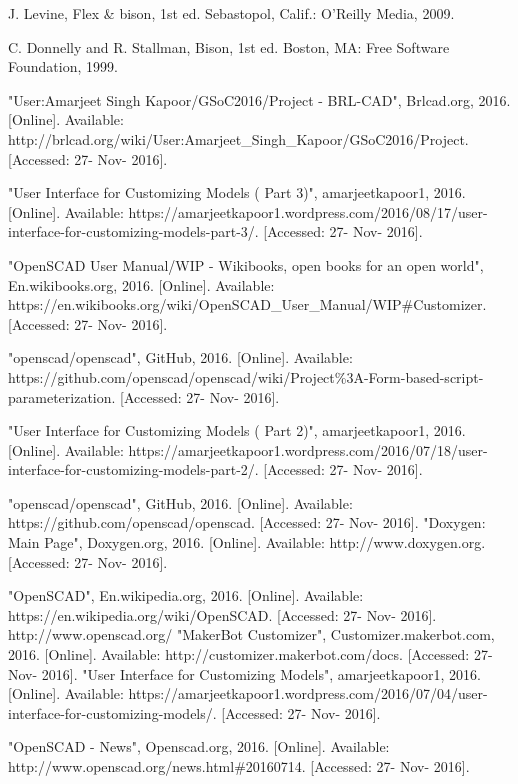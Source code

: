  
\begin{thebibliography}{22}

\bibitem{} J. Levine, Flex \& bison, 1st ed. Sebastopol, Calif.: O'Reilly Media, 2009.

\bibitem{} C. Donnelly and R. Stallman, Bison, 1st ed. Boston, MA: Free Software Foundation, 1999.

\bibitem{} "User:Amarjeet Singh Kapoor/GSoC2016/Project - BRL-CAD", Brlcad.org, 2016. [Online]. Available: http://brlcad.org/wiki/User:Amarjeet\_Singh\_Kapoor/GSoC2016/Project. [Accessed: 27- Nov- 2016].

\bibitem{} "User Interface for Customizing Models ( Part 3)", amarjeetkapoor1, 2016. [Online]. Available: https://amarjeetkapoor1.wordpress.com/2016/08/17/user-interface-for-customizing-models-part-3/. [Accessed: 27- Nov- 2016].


\bibitem{} "OpenSCAD User Manual/WIP - Wikibooks, open books for an open world", En.wikibooks.org, 2016. [Online]. Available: https://en.wikibooks.org/wiki/OpenSCAD\_User\_Manual/WIP\#Customizer. [Accessed: 27- Nov- 2016].

\bibitem{} "openscad/openscad", GitHub, 2016. [Online]. Available: https://github.com/openscad/openscad/wiki/Project\%3A-Form-based-script-parameterization. [Accessed: 27- Nov- 2016].

\bibitem{} "User Interface for Customizing Models ( Part 2)", amarjeetkapoor1, 2016. [Online]. Available: https://amarjeetkapoor1.wordpress.com/2016/07/18/user-interface-for-customizing-models-part-2/. [Accessed: 27- Nov- 2016].

\bibitem{} "openscad/openscad", GitHub, 2016. [Online]. Available: https://github.com/openscad/openscad. [Accessed: 27- Nov- 2016].
\bibitem{} "Doxygen: Main Page", Doxygen.org, 2016. [Online]. Available: http://www.doxygen.org. [Accessed: 27- Nov- 2016].

\bibitem{} "OpenSCAD", En.wikipedia.org, 2016. [Online]. Available: https://en.wikipedia.org/wiki/OpenSCAD. [Accessed: 27- Nov- 2016].
\bibitem{} http://www.openscad.org/
\bibitem{} "MakerBot Customizer", Customizer.makerbot.com, 2016. [Online]. Available: http://customizer.makerbot.com/docs. [Accessed: 27- Nov- 2016].
\bibitem{} "User Interface for Customizing Models", amarjeetkapoor1, 2016. [Online]. Available: https://amarjeetkapoor1.wordpress.com/2016/07/04/user-interface-for-customizing-models/. [Accessed: 27- Nov- 2016].

\bibitem{} "OpenSCAD - News", Openscad.org, 2016. [Online]. Available: http://www.openscad.org/news.html\#20160714. [Accessed: 27- Nov- 2016].


\end{thebibliography}
